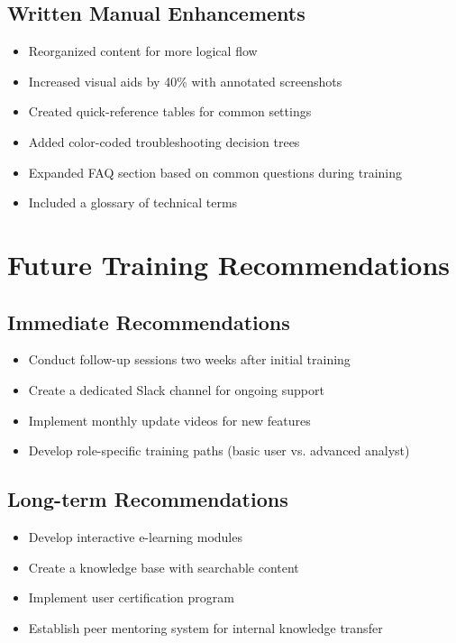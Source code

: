 \documentclass[12pt, letterpaper]{article}
\begin{document}
\subsection{Written Manual Enhancements}
\begin{itemize}
    \item Reorganized content for more logical flow
    \item Increased visual aids by 40\% with annotated screenshots
    \item Created quick-reference tables for common settings
    \item Added color-coded troubleshooting decision trees
    \item Expanded FAQ section based on common questions during training
    \item Included a glossary of technical terms
\end{itemize}

\section{Future Training Recommendations}

\subsection{Immediate Recommendations}
\begin{itemize}
    \item Conduct follow-up sessions two weeks after initial training
    \item Create a dedicated Slack channel for ongoing support
    \item Implement monthly update videos for new features
    \item Develop role-specific training paths (basic user vs. advanced analyst)
\end{itemize}

\subsection{Long-term Recommendations}
\begin{itemize}
    \item Develop interactive e-learning modules
    \item Create a knowledge base with searchable content
    \item Implement user certification program
    \item Establish peer mentoring system for internal knowledge transfer
\end{itemize}
\end{document}
